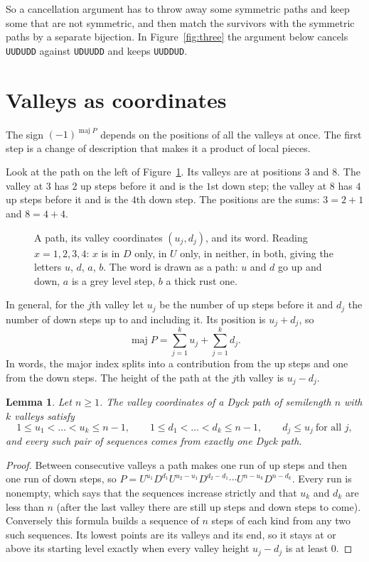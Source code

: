 \documentclass[11pt]{article}
\newtheorem{lemma}{Lemma}
\theoremstyle{remark}
\newcommand{\maj}{\operatorname{maj}}
\newcommand{\w}[1]{\texttt{#1}}
\begin{document}
So a cancellation argument has to throw away some symmetric paths and keep some that are not
symmetric, and then match the survivors with the symmetric paths by a separate bijection. In
Figure~\ref{fig:three} the argument below cancels \w{UUDUDD} against \w{UDUUDD} and keeps
\w{UUDDUD}.

\section{Valleys as coordinates}

The sign $(-1)^{\maj P}$ depends on the positions of all the valleys at once. The first step is a
change of description that makes it a product of local pieces.

Look at the path on the left of Figure~\ref{fig:encode}. Its valleys are at positions $3$ and $8$.
The valley at $3$ has $2$ up steps before it and is the $1$st down step; the valley at $8$ has $4$
up steps before it and is the $4$th down step. The positions are the sums: $3=2+1$ and $8=4+4$.

\begin{figure}[ht]
\centering

\caption{A path, its valley coordinates $(u_j,d_j)$, and its word. Reading $x=1,2,3,4$: $x$ is in
$D$ only, in $U$ only, in neither, in both, giving the letters $u$, $d$, $a$, $b$. The word is
drawn as a path: $u$ and $d$ go up and down, $a$ is a grey level step, $b$ a thick rust one.}
\label{fig:encode}
\end{figure}

In general, for the $j$th valley let $u_j$ be the number of up steps before it and $d_j$ the
number of down steps up to and including it. Its position is $u_j+d_j$, so
\begin{equation}\label{eq:maj}
\maj P=\sum_{j=1}^k u_j+\sum_{j=1}^k d_j .
\end{equation}
In words, the major index splits into a contribution from the up steps and one from the down
steps. The height of the path at the $j$th valley is $u_j-d_j$.

\begin{lemma}\label{lem:coords}
Let $n\ge1$. The valley coordinates of a Dyck path of semilength $n$ with $k$ valleys satisfy
\[
1\le u_1<\dots<u_k\le n-1,\qquad 1\le d_1<\dots<d_k\le n-1,\qquad d_j\le u_j\ \text{for all } j,
\]
and every such pair of sequences comes from exactly one Dyck path.
\end{lemma}

\begin{proof}
Between consecutive valleys a path makes one run of up steps and then one run of down steps,
so $P=U^{u_1}D^{d_1}U^{u_2-u_1}D^{d_2-d_1}\cdots U^{n-u_k}D^{n-d_k}$. Every run is nonempty,
which says that the sequences increase strictly and that $u_k$ and $d_k$ are less than $n$
(after the last valley there are still up steps and down steps to come). Conversely this formula
builds a sequence of $n$ steps of each kind from any two such sequences. Its lowest points are
its valleys and its end, so it stays at or above its starting level exactly when every valley
height $u_j-d_j$ is at least $0$.
\end{proof}
\end{document}
